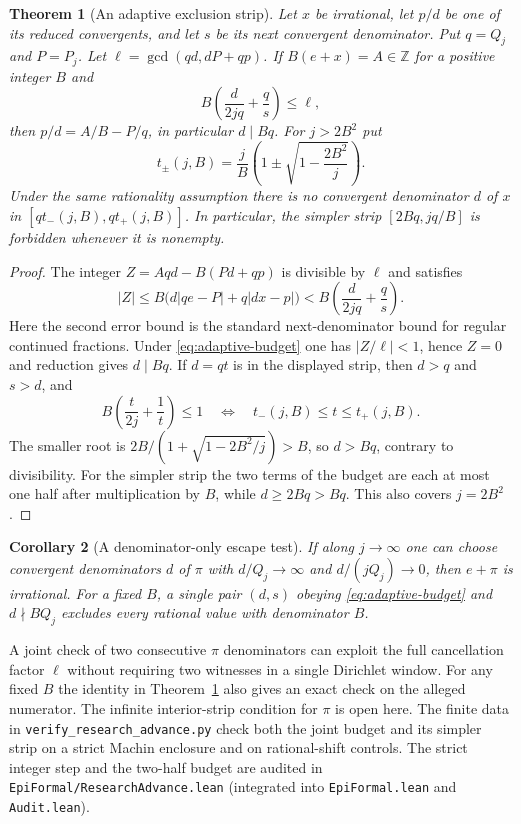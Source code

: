 \documentclass[11pt]{amsart}
\newtheorem{theorem}{Theorem}[section]
\newtheorem{corollary}[theorem]{Corollary}
\theoremstyle{definition}
\theoremstyle{remark}
\numberwithin{equation}{section}
\newcommand{\Z}{\mathbb{Z}}
\begin{document}
\begin{theorem}[An adaptive exclusion strip]\label{thm:adaptive-strip}
Let $x$ be irrational, let $p/d$ be one of its reduced convergents,
and let $s$ be its next convergent denominator. Put $q=Q_j$ and
$P=P_j$. Let $\ell=\gcd(qd,dP+qp)$. If $B(e+x)=A\in\Z$ for a
positive integer $B$ and
\begin{equation}\label{eq:adaptive-budget}
 B\left(\frac{d}{2jq}+\frac{q}{s}\right)\le\ell,
\end{equation}
then $p/d=A/B-P/q$, in particular $d\mid Bq$.
For $j>2B^2$ put
\[
 t_\pm(j,B)=\frac{j}{B}\left(1\pm\sqrt{1-\frac{2B^2}{j}}\right).
\]
Under the same rationality assumption there is no convergent
denominator $d$ of $x$ in $[qt_-(j,B),qt_+(j,B)]$.
In particular, the simpler strip $[2Bq,jq/B]$ is forbidden whenever
it is nonempty.
\end{theorem}
\begin{proof}
The integer $Z=Aqd-B(Pd+qp)$ is divisible by $\ell$ and satisfies
\[
 |Z|\le B\bigl(d|qe-P|+q|dx-p|\bigr)
 < B\left(\frac{d}{2jq}+\frac{q}{s}\right).
\]
Here the second error bound is the standard next-denominator bound
for regular continued fractions. Under \eqref{eq:adaptive-budget}
one has $|Z/\ell|<1$, hence $Z=0$ and reduction gives $d\mid Bq$.
If $d=qt$ is in the displayed strip, then $d>q$ and $s>d$, and
\[
 B\left(\frac{t}{2j}+\frac1t\right)\le1
 \quad\Longleftrightarrow\quad t_-(j,B)\le t\le t_+(j,B).
\]
The smaller root is $2B/(1+\sqrt{1-2B^2/j})>B$, so $d>Bq$,
contrary to divisibility. For the simpler strip the two terms of the
budget are each at most one half after multiplication by $B$, while
$d\ge2Bq>Bq$. This also covers $j=2B^2$.
\end{proof}
\begin{corollary}[A denominator-only escape test]\label{cor:strip-escape}
If along $j\to\infty$ one can choose convergent denominators $d$ of
$\pi$ with $d/Q_j\to\infty$ and $d/(jQ_j)\to0$, then $e+\pi$ is
irrational. For a fixed $B$, a single pair $(d,s)$ obeying
\eqref{eq:adaptive-budget} and $d\nmid BQ_j$ excludes every rational
value with denominator $B$.
\end{corollary}
A joint check of two consecutive $\pi$ denominators can exploit
the full cancellation factor $\ell$ without requiring two witnesses
in a single Dirichlet window.
For any fixed $B$ the identity in Theorem~\ref{thm:adaptive-strip}
also gives an exact check on the alleged numerator. The infinite
interior-strip condition for $\pi$ is open here. The finite data in
\texttt{verify\_research\_advance.py} check both the joint budget and
its simpler strip on a strict Machin enclosure and on rational-shift
controls. The strict integer step and the two-half budget are
audited in \texttt{EpiFormal/ResearchAdvance.lean} (integrated into
\texttt{EpiFormal.lean} and \texttt{Audit.lean}).
\end{document}
